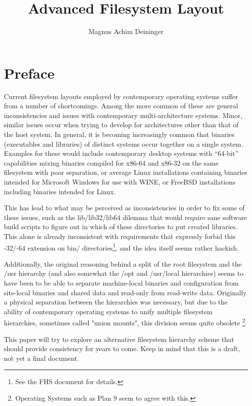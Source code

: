 \documentclass[a4paper,twoside,titlepage]{article}
\title{Advanced Filesystem Layout}
\author{Magnus Achim Deininger}
\begin{document}
\maketitle
\tableofcontents

\newpage

\section*{Preface}
Current filesystem layouts employed by contemporary operating systems suffer
from a number of shortcomings. Among the more common of these are general
inconsistencies and issues with contemporary multi-architecture systems. Minor,
similar issues occur when trying to develop for architectures other than that of
the host system. In general, it is becoming increasingly common that binaries
(executables and libraries) of distinct systems occur together on a single
system. Examples for these would include contemporary desktop systems with
``64-bit'' capabilities mixing binaries compiled for x86-64 and x86-32 on the
same filesystem with poor separation, or average Linux installations containing
binaries intended for Microsoft Windows for use with WINE, or FreeBSD
installations including binaries intended for Linux.

This has lead to what may be perceived as inconsistencies in order to fix some
of these issues, such as the lib/lib32/lib64 dilemma that would require sane
software build scripts to figure out in which of these directories to put
created libraries. This alone is already inconsistent with requirements that
expressly forbid this -32/-64 extension on bin/ directories\footnote{See the FHS
document for details.}, and the idea itself seems rather hackish.

Additionally, the original reasoning behind a split of the root filesystem and
the /usr hierarchy (and also somewhat the /opt and /usr/local hierarchies) seems
to have been to be able to separate machine-local binaries and configuration
from site-local binaries and shared data and read-only from read-write data.
Originally a physical separation between the hierarchies was necessary, but due
to the ability of contemporary operating systems to unify multiple filesystem
hierarchies, sometimes called "union mounts", this division seems quite obsolete
\footnote{Operating Systems such as Plan 9 seem to agree with this.}.

This paper will try to explore an alternative filesystem hierarchy scheme that
should provide consistency for years to come. Keep in mind that this is a draft,
not yet a final document.
\end{document}
